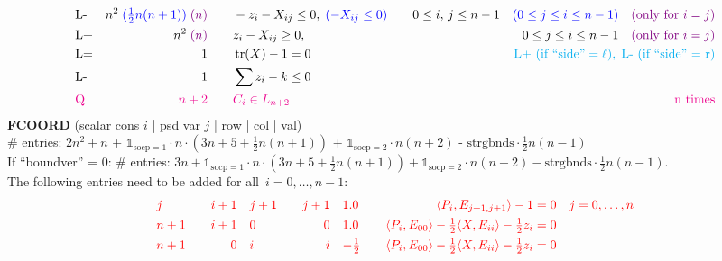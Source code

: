 \documentclass[11pt,a4paper]{article}
\newcommand{\ones}{\mathds{1}}
\DeclareMathOperator{\tr}{tr}
\theoremstyle{definition}
\begin{document}
{\[\begin{aligned}
    &\text{L-} &n^2\; {\color{blue}(\tfrac{1}{2}n(n+1))}\; {\color{violet}(n)} \qquad & -z_i - X_{ij} \leq 0,\;
    {\color{blue} (-X_{ij} \leq 0)}\quad & 0 \leq i,\, j \leq n-1\quad {\color{blue}(0
    \leq j \leq i \leq n-1)}\quad {\color{violet} (\text{only for } i=j)} \\
    &\text{L+} &n^2\; {\color{violet}(n)} \qquad & z_i - X_{ij} \geq 0,\quad & 0
    \leq j \leq i \leq n-1 \quad {\color{violet} (\text{only for } i=j)} \\
    &\text{L=}  &1 \qquad & \tr(X) - 1 = 0 \quad & \qquad
    {\color{cyan} \text{L+ (if ``side''} = \ell),\; \text{L- (if ``side'' = r})} \\
    &\text{L-}  &1 \qquad & \sum z_i - k \leq 0 \\
    &{\color{magenta} \text{Q}} & {\color{magenta} n+2} \qquad &
    {\color{magenta} C_i \in L_{n+2}} \qquad &
    {\color{magenta} \text{n times}}
 \end{aligned}
\]
\textbf{FCOORD} (scalar cons $i$ | psd var $j$ | row | col | val) \\
\# entries: $2n^2+n$ + {\color{red}
  $\ones_{\text{socp}=1} \cdot n\cdot(3n+5+\tfrac{1}{2}n(n+1))$ } +
{\color{magenta} $\ones_{\text{socp}=2} \cdot n(n+2)$ } - {\color{blue}
  $\text{strgbnds} \cdot
  \tfrac{1}{2}n(n-1)$}\\
{\color{violet} If ``boundver'' = 0: \# entries:
  $3n + \ones_{\text{socp}=1} \cdot n\cdot(3n+5+\tfrac{1}{2}n(n+1)) +
  \ones_{\text{socp}=2} \cdot n(n+2) - \text{strgbnds} \cdot
  \tfrac{1}{2}n(n-1)$.}\\
{\color{red} The following entries need to be added for
  all~$i = 0,\dots,n-1$}:
\[
  \begin{aligned}
    &{\color{red}j} \quad &{\color{red}i+1} \quad & {\color{red}j+1} \quad
    & {\color{red}j+1} \quad & {\color{red}1.0} \quad & {\color{red}
      \langle P_i,
      E_{j+1,j+1} \rangle - 1 = 0} \quad & {\color{red} j = 0,\dots,n} \\
    &{\color{red}n+1} \quad &{\color{red}i+1} \quad & {\color{red}0} \quad
    & {\color{red}0} \quad & {\color{red}1.0} \quad & {\color{red} \langle
      P_i, E_{00} \rangle - \tfrac{1}{2}\langle X,E_{ii}\rangle -
      \tfrac{1}{2}z_i = 0} \quad & \\
    &{\color{red}n+1} \quad &{\color{red}0} \quad & {\color{red}i} \quad
    & {\color{red}i} \quad & {\color{red}-\tfrac{1}{2}} \quad & {\color{red} \langle
      P_i, E_{00} \rangle - \tfrac{1}{2}\langle X,E_{ii}\rangle -
      \tfrac{1}{2}z_i = 0} \quad & \\

\end{aligned}\]}
\end{document}
